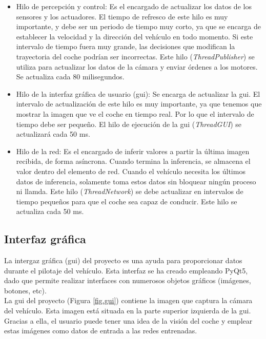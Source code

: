 \begin{itemize}
    \item Hilo de percepción y control: Es el encargado de actualizar los datos de los sensores y los actuadores. El tiempo de refresco de este hilo es muy importante, y debe ser un periodo de tiempo muy corto, ya que se encarga de establecer la velocidad y la dirección del vehículo en todo momento. Si este intervalo de tiempo fuera muy grande, las decisiones que modifican la trayectoria del coche podrían ser incorrectas. Este hilo (\textit{ThreadPublisher}) se utiliza para actualizar los datos de la cámara y enviar órdenes a los motores. Se actualiza cada 80 milisegundos.
    
    \item Hilo de la interfaz gráfica de usuario (\acrshort{gui}): Se encarga de actualizar la \acrshort{gui}. El intervalo de actualización de este hilo es muy importante, ya que tenemos que mostrar la imagen que ve el coche en tiempo real. Por lo que el intervalo de tiempo debe ser pequeño. El hilo de ejecución de la \acrshort{gui} (\textit{ThreadGUI}) se actualizará cada 50 ms.
    
    \item Hilo de la red: Es el encargado de inferir valores a partir la última imagen recibida, de forma asíncrona. Cuando termina la inferencia, se almacena el valor dentro del elemento de red. Cuando el vehículo necesita los últimos datos de inferencia, solamente toma estos datos sin bloquear ningún proceso ni llamda. Este hilo (\textit{ThreadNetwork}) se debe actualizar en intervalos de tiempo pequeños para que el coche sea capaz de conducir. Este hilo se actualiza cada 50 ms.

\end{itemize}

\subsection{Interfaz gráfica}

La intergaz gráfica (\acrshort{gui}) del proyecto es una ayuda para proporcionar datos durante el pilotaje del vehículo. Esta interfaz se ha creado empleando PyQt5, dado que permite realizar interfaces con numerosos objetos gráficos (imágenes, botones, etc).\\

La \acrshort{gui} del proyecto (Figura \ref{fig.gui}) contiene la imagen que captura la cámara del vehículo. Esta imagen está situada en la parte superior izquierda de la \acrshort{gui}. Gracias a ella, el usuario puede tener una idea de la visión del coche y emplear estas imágenes como datos de entrada a las redes entrenadas.\\

